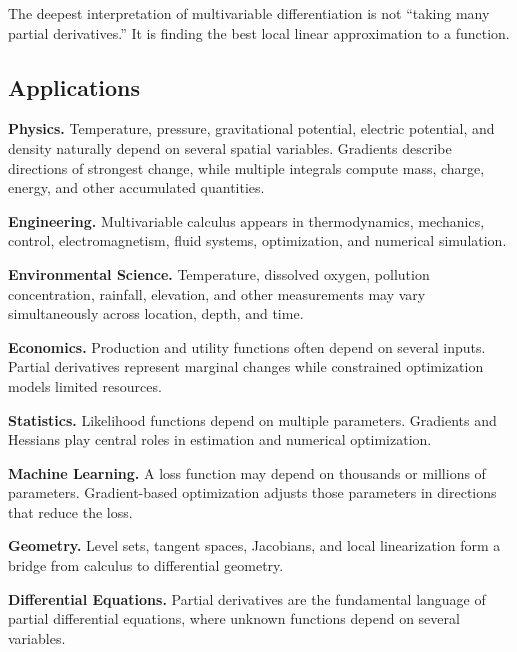 \begin{conceptbox}
The deepest interpretation of multivariable differentiation is not
``taking many partial derivatives.'' It is finding the best local linear
approximation to a function.
\end{conceptbox}

\subsection{Applications}
\label{subsec:multivariable-applications}

\begin{applicationbox}
\textbf{Physics.}
Temperature, pressure, gravitational potential, electric potential, and
density naturally depend on several spatial variables. Gradients describe
directions of strongest change, while multiple integrals compute mass,
charge, energy, and other accumulated quantities.

\medskip

\textbf{Engineering.}
Multivariable calculus appears in thermodynamics, mechanics, control,
electromagnetism, fluid systems, optimization, and numerical simulation.

\medskip

\textbf{Environmental Science.}
Temperature, dissolved oxygen, pollution concentration, rainfall, elevation,
and other measurements may vary simultaneously across location, depth, and
time.

\medskip

\textbf{Economics.}
Production and utility functions often depend on several inputs. Partial
derivatives represent marginal changes while constrained optimization
models limited resources.

\medskip

\textbf{Statistics.}
Likelihood functions depend on multiple parameters. Gradients and Hessians
play central roles in estimation and numerical optimization.

\medskip

\textbf{Machine Learning.}
A loss function may depend on thousands or millions of parameters.
Gradient-based optimization adjusts those parameters in directions that
reduce the loss.

\medskip

\textbf{Geometry.}
Level sets, tangent spaces, Jacobians, and local linearization form a bridge
from calculus to differential geometry.

\medskip

\textbf{Differential Equations.}
Partial derivatives are the fundamental language of partial differential
equations, where unknown functions depend on several variables.
\end{applicationbox}

